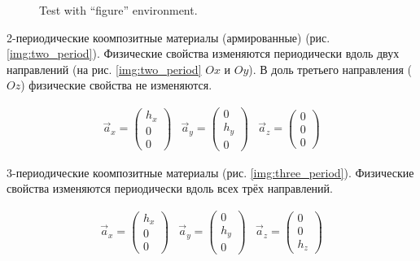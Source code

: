 \begin{figure}[h]
  \def\svgwidth{1.5\textwidth}%
  \resizebox{\textwidth}{!}{%
  }
  \caption{Test with ``figure'' environment.}
\end{figure}
2-периодические коомпозитные материалы (армированные) (рис. \ref{img:two_period}).
Физические свойства изменяются периодически вдоль двух направлений (на рис. \ref{img:two_period} $Ox$ и $Oy$). 
В доль третьего направления ($Oz$) физические свойства не изменяются. 

\begin{equation}
    \begin{array}{ccc}
        \vec{a}_x = \left(\begin{array}{c}h_x\\0\\0\end{array}\right) & 
        \vec{a}_y = \left(\begin{array}{c}0\\h_y\\0\end{array}\right) & 
        \vec{a}_z = \left(\begin{array}{c}0\\0\\0\end{array}\right)
    \end{array}
\end{equation}


3-периодические коомпозитные материалы (рис. \ref{img:three_period}).
Физические свойства изменяются периодически вдоль всех трёх направлений.

\begin{equation}
    \begin{array}{ccc}
        \vec{a}_x = \left(\begin{array}{c}h_x\\0\\0\end{array}\right) & 
        \vec{a}_y = \left(\begin{array}{c}0\\h_y\\0\end{array}\right) & 
        \vec{a}_z = \left(\begin{array}{c}0\\0\\h_z\end{array}\right)
    \end{array}
\end{equation}

